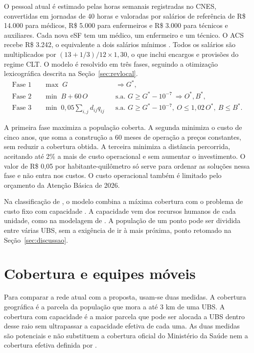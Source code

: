 \documentclass[12pt,a4paper,oneside]{report}
\begin{document}
O pessoal atual é estimado pelas horas semanais registradas no CNES, convertidas em jornadas de 40 horas
e valoradas por salários de referência de R\$ 14.000 para médicos, R\$ 5.000 para enfermeiros e
R\$ 3.000 para técnicos e auxiliares. Cada nova eSF tem um médico, um enfermeiro e um técnico. O ACS
recebe R\$ 3.242, o equivalente a dois salários mínimos \citep{brasil2022,brasil2025sm}. Todos os
salários são multiplicados por $(13+1/3)/12\times1{,}30$, o que inclui encargos e provisões do regime CLT.
O modelo é resolvido em três fases, seguindo a otimização lexicográfica descrita na Seção~\ref{sec:revlocal}.
\begin{align}
\text{Fase 1}\quad&\max\;G &&\Rightarrow G^*,\\
\text{Fase 2}\quad&\min\;B+60\,O &&\text{s.a. }G\geq G^*-10^{-7}\ \Rightarrow O^*,B^*,\\
\text{Fase 3}\quad&\min\;0{,}05\sum_{i,j}d_{ij}q_{ij}
&&\text{s.a. }G\geq G^*-10^{-7},\ O\leq1{,}02\,O^*,\ B\leq B^*.
\end{align}

A primeira fase maximiza a população coberta. A segunda minimiza o custo de cinco anos, que soma a
construção a 60 meses de operação a preços constantes, sem reduzir a cobertura obtida. A terceira
minimiza a distância percorrida, aceitando até 2\% a mais de custo operacional e sem aumentar o
investimento. O valor de R\$ 0,05 por habitante-quilômetro só serve para ordenar as soluções nessa fase
e não entra nos custos. O custo operacional também é limitado pelo orçamento da Atenção Básica de 2026.

Na classificação de \citet{daskin2008}, o modelo combina a máxima cobertura \citep{church1974} com o
problema de custo fixo com capacidade \citep{ahmadi2017}. A capacidade vem dos recursos humanos de cada
unidade, como na modelagem de \citet{contreras2019}. A população de um ponto pode ser dividida entre
várias UBS, sem a exigência de ir à mais próxima, ponto retomado na Seção~\ref{sec:discussao}.

\section{Cobertura e equipes móveis}\label{sec:movel}
Para comparar a rede atual com a proposta, usam-se duas medidas. A cobertura geográfica é a parcela da
população que mora a até 3 km de uma UBS. A cobertura com capacidade é a maior parcela que pode ser
alocada a UBS dentro desse raio sem ultrapassar a capacidade efetiva de cada uma. As duas medidas são
potenciais e não substituem a cobertura oficial do Ministério da Saúde \citep{aps2026} nem a cobertura
efetiva definida por \citet{shengelia2005}.
\end{document}
